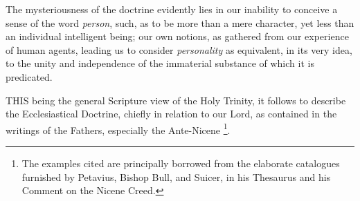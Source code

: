 The mysteriousness of the doctrine evidently lies in our inability
to conceive a sense of the word \emph{person}, such, as to be more than a
mere character, yet less than an individual intelligent being; our own
notions, as gathered from our experience of human agents, leading us
to consider \emph{personality} as equivalent, in its very idea, to the
unity and independence of the immaterial substance of which it is
predicated.


THIS being the general Scripture view
of the Holy Trinity, it follows to describe the Ecclesiastical
Doctrine, chiefly in relation to our Lord, as contained in the
writings of the Fathers, especially the Ante-Nicene \footnote{The examples cited are principally borrowed from the elaborate
catalogues furnished by Petavius, Bishop Bull, and Suicer, in his
Thesaurus and his Comment on the Nicene Creed.}.

